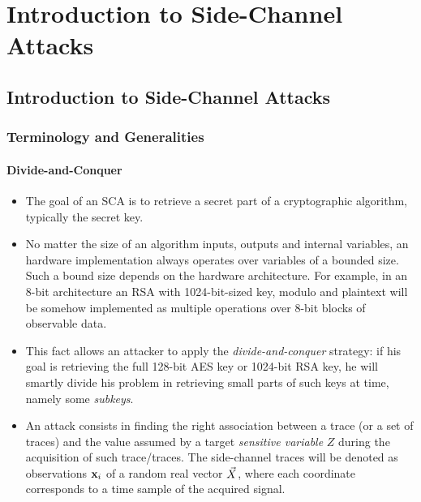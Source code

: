 \chapter{Introduction to Side-Channel Attacks} %

\label{ChapterIntroductionSCA}


\section{Introduction to Side-Channel Attacks}

\subsection{Terminology and Generalities}

\subsubsection{Divide-and-Conquer}

\begin{itemize}
\item The goal of an SCA is to retrieve a secret part of a cryptographic algorithm, typically the secret key.
\item No matter the size of an algorithm inputs, outputs and internal variables, an hardware implementation  always operates over variables of a bounded size. Such a bound size depends on the hardware architecture. For example, in an 8-bit architecture an RSA with 1024-bit-sized key, modulo and plaintext will be somehow implemented as multiple operations over 8-bit blocks of observable data. 
\item This fact allows an attacker to apply the \emph{divide-and-conquer} strategy: if his goal is retrieving the full 128-bit AES key or 1024-bit RSA key, he will smartly divide his problem in retrieving small parts of such keys at time, namely some \emph{subkeys}.  
\item An attack consists in finding the right association between a trace (or a set of traces) and the value assumed by a target \emph{sensitive variable} $Z$ during the acquisition of such trace/traces. The side-channel traces will be denoted as observations $\textbf{x}_{i}{}$ of a random real vector $\vec{X}$, where each coordinate corresponds to a time sample of the acquired signal. 
\end{itemize}
